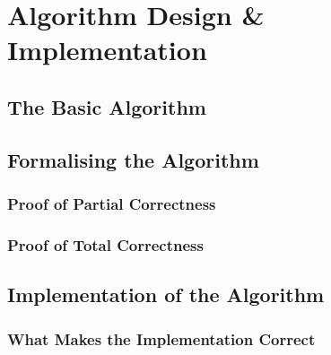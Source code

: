 \chapter{Algorithm Design \& Implementation}
\label{sec:algorithm}

\section{The Basic Algorithm}
\label{sec:algorithm-basic}


\section{Formalising the Algorithm}
\label{sec:algorithm-formalising}


\subsection{Proof of Partial Correctness}
\label{sec:algorithm-formalising-partial}


\subsection{Proof of Total Correctness}
\label{sec:algorithm-formalising-total}


\section{Implementation of the Algorithm}
\label{sec:algorithm-implementation}


\subsection{What Makes the Implementation Correct}
\label{sec:algorithm-implementation-correctness}

